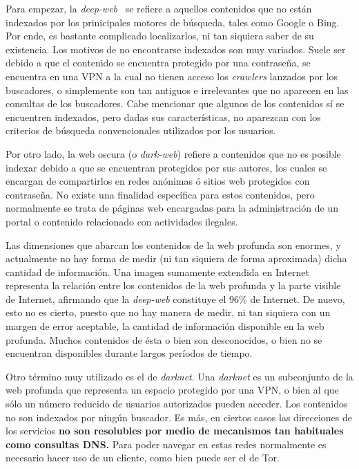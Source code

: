 Para empezar, la \textit{deep-web}~\cite{article:deepweb} se refiere a aquellos contenidos que no están indexados por los prinicipales motores de búsqueda, tales como Google o Bing. Por ende, es bastante complicado localizarlos, ni tan siquiera saber de su existencia.
Los motivos de no encontrarse indexados son muy variados. Suele ser debido a que el contenido se encuentra protegido por una contraseña, se encuentra en una VPN a la cual no tienen acceso los \textit{crawlers} lanzados por los buscadores, o simplemente son tan antiguos e irrelevantes que no aparecen en las consultas de los buscadores.
Cabe mencionar que algunos de los contenidos sí se encuentren indexados, pero dadas sus características, no aparezcan con los criterios de búsqueda convencionales utilizados por los usuarios.

Por otro lado, la web oscura (o \textit{dark-web}) refiere a contenidos que no es posible indexar debido a que se encuentran protegidos por sus autores, los cuales se encargan de compartirlos en redes anónimas ó sitios web protegidos con contraseña. 
No existe una finalidad específica para estos contenidos, pero normalmente se trata de páginas web encargadas para la administración de un portal o contenido relacionado con actividades ilegales.

Las dimensiones que abarcan los contenidos de la web profunda son enormes, y actualmente no hay forma de medir (ni tan siquiera de forma aproximada)	dicha cantidad de información.
Una imagen sumamente extendida en Internet representa la relación entre los contenidos de la web profunda y la parte visible de Internet, afirmando que la \textit{deep-web} constituye el 96\% de Internet. De nuevo, esto no es cierto, puesto que no hay manera de medir, ni tan siquiera con un margen de error aceptable, la cantidad de información disponible en la web profunda. Muchos contenidos de ésta o bien son desconocidos, o bien no se encuentran disponibles durante largos períodos de tiempo.

Otro término muy utilizado es el de \textit{darknet}. Una \textit{darknet }es un subconjunto de la web profunda que representa un espacio protegido por una VPN, o bien al que sólo un número reducido de usuarios autorizados pueden acceder. Los contenidos no son indexados por ningún buscador. Es más, en ciertos casos las direcciones de los servicios \textbf{no son resolubles por medio de mecanismos tan habituales como consultas DNS.} Para poder navegar en estas redes normalmente es necesario hacer uso de un cliente, como bien puede ser el de Tor.

